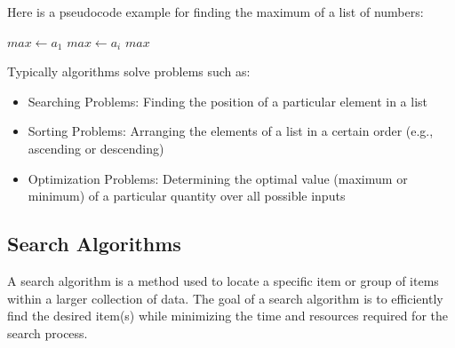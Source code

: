 \begin{eg}
    Here is a pseudocode example for finding the maximum of a list of numbers:
    \begin{algorithmic}
            \State $max \gets a_1$
                    \State $max \gets a_i$
                \EndIf
            \EndFor
            \State \Return $max$
        \EndFunction
    \end{algorithmic}
\end{eg}
Typically algorithms solve problems such as:
\begin{itemize}[itemsep=1pt,label=$\circ$]
    \item Searching Problems: Finding the position of a particular element in a list
    \item Sorting Problems: Arranging the elements of a list in a certain order (e.g., ascending or descending)
    \item Optimization Problems: Determining the optimal value (maximum or minimum) of a particular quantity over all possible inputs
\end{itemize}

\subsection{Search Algorithms}
\begin{definition}
    A search algorithm is a method used to locate a specific item or group of items within a larger collection of data. The goal of a search algorithm is to efficiently find the desired item(s) while minimizing the time and resources required for the search process.
\end{definition}

